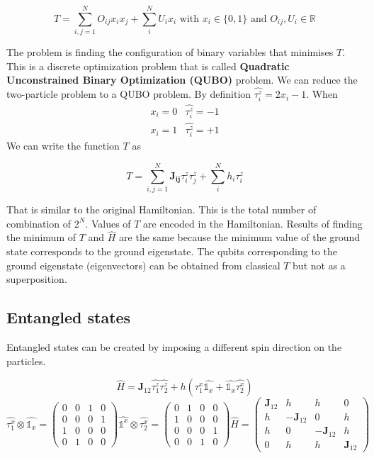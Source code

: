 	$$T=\sum_{i,j=1}^N O_{ij}x_ix_j+\sum_i^N U_ix_i \text{ with } x_i\in \{0,1\} \text{ and } O_{ij},U_i\in \mathbb{R}$$

	The problem is finding the configuration of binary variables that minimises $T$.
	This is a discrete optimization problem that is called \textbf{Quadratic Unconstrained Binary Optimization (QUBO)} problem.
	We can reduce the two-particle problem to a QUBO problem.
	By definition $\hat{\tau_i^z}=2x_i-1$.
	When \[\begin{matrix}x_i=0&\hat{\tau_i^z}=-1\\x_i=1&\hat{\tau_i^z}=+1 \end{matrix}\]
	We can write the function $T$ as

	$$T=\sum_{i,j=1}^N \mathbf{J_{ij}}\tau_i^z\tau_j^z+\sum_i^N h_i\tau_i^z$$

	That is similar to the original Hamiltonian.
	This is the total number of combination of $2^N$.
	Values of $T$ are encoded in the Hamiltonian.
	Results of finding the minimum of $T$ and $\hat{H}$ are the same because the minimum value of the ground state corresponds to the ground eigenstate.
	The qubits corresponding to the ground eigenstate (eigenvectors) can be obtained from classical $T$ but not as a superposition.

	\subsection{Entangled states}
	Entangled states can be created by imposing a different spin direction on the particles.

	$$\hat{H}=\mathbf{J}_{12}\hat{\tau_1^z}\hat{\tau_2^z}+h(\hat{\tau_1^x}\hat{\mathbb{1}_x}+\hat{\mathbb{1}_x}\hat{\tau_2^x})$$
	$$\hat{\tau_1^x}\otimes\hat{\mathbb{1}_x}=\begin{pmatrix}0&0&1&0\\0&0&0&1\\1&0&0&0\\0&1&0&0\end{pmatrix}\hat{\mathbb{1}^x}\otimes\hat{\tau_2^x}=\begin{pmatrix}0&1&0&0\\1&0&0&0\\0&0&0&1\\0&0&1&0\end{pmatrix}\hat{H}=\begin{pmatrix}\mathbf{J}_{12}&h&h&0\\h&-\mathbf{J}_{12}&0&h\\h&0&-\mathbf{J}_{12}&h\\0&h&h&\mathbf{J}_{12}\end{pmatrix}$$

